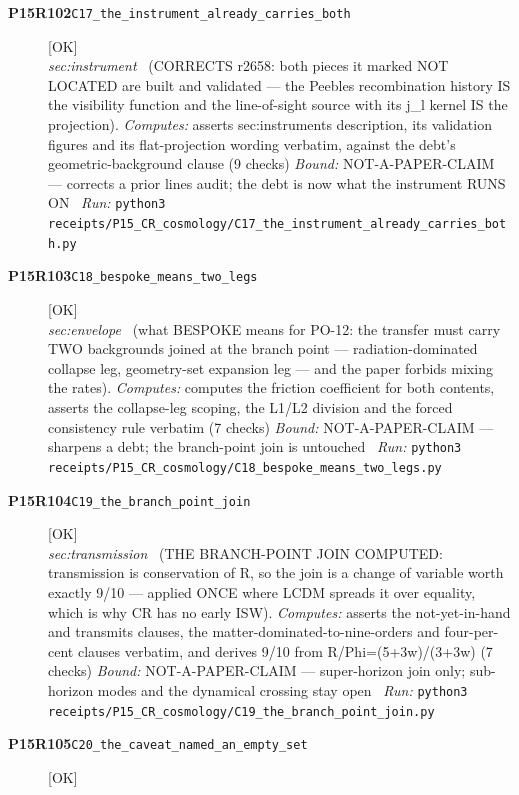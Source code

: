 \begin{description}
\item[\textbf{P15R102}\quad\texttt{C17\_the\_instrument\_already\_carries\_both}]\hfill\textsf{[OK]}\\
\textit{sec:instrument} \ (CORRECTS r2658: both pieces it marked NOT LOCATED are built and validated --- the Peebles recombination history IS the visibility function and the line-of-sight source with its j\_l kernel IS the projection). 
\emph{Computes:} asserts sec:instruments description, its validation figures and its flat-projection wording verbatim, against the debt's geometric-background clause (9 checks)
 \emph{Bound:} NOT-A-PAPER-CLAIM --- corrects a prior lines audit; the debt is now what the instrument RUNS ON
\ \emph{Run:} \texttt{python3 receipts/P15\_CR\_cosmology/C17\_the\_instrument\_already\_carries\_both.py}
\item[\textbf{P15R103}\quad\texttt{C18\_bespoke\_means\_two\_legs}]\hfill\textsf{[OK]}\\
\textit{sec:envelope} \ (what BESPOKE means for PO-12: the transfer must carry TWO backgrounds joined at the branch point --- radiation-dominated collapse leg, geometry-set expansion leg --- and the paper forbids mixing the rates). 
\emph{Computes:} computes the friction coefficient for both contents, asserts the collapse-leg scoping, the L1/L2 division and the forced consistency rule verbatim (7 checks)
 \emph{Bound:} NOT-A-PAPER-CLAIM --- sharpens a debt; the branch-point join is untouched
\ \emph{Run:} \texttt{python3 receipts/P15\_CR\_cosmology/C18\_bespoke\_means\_two\_legs.py}
\item[\textbf{P15R104}\quad\texttt{C19\_the\_branch\_point\_join}]\hfill\textsf{[OK]}\\
\textit{sec:transmission} \ (THE BRANCH-POINT JOIN COMPUTED: transmission is conservation of R, so the join is a change of variable worth exactly 9/10 --- applied ONCE where LCDM spreads it over equality, which is why CR has no early ISW). 
\emph{Computes:} asserts the not-yet-in-hand and transmits clauses, the matter-dominated-to-nine-orders and four-per-cent clauses verbatim, and derives 9/10 from R/Phi=(5+3w)/(3+3w) (7 checks)
 \emph{Bound:} NOT-A-PAPER-CLAIM --- super-horizon join only; sub-horizon modes and the dynamical crossing stay open
\ \emph{Run:} \texttt{python3 receipts/P15\_CR\_cosmology/C19\_the\_branch\_point\_join.py}
\item[\textbf{P15R105}\quad\texttt{C20\_the\_caveat\_named\_an\_empty\_set}]\hfill\textsf{[OK]}\\

\end{description}
